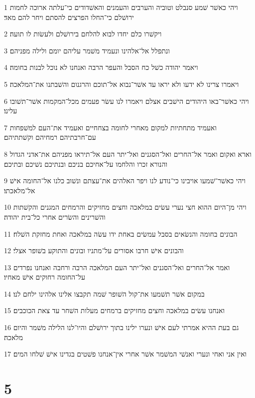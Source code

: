 \par 1 ויהי כאשׁר שׁמע סנבלט וטוביה והערבים והעמנים והאשׁדודים כי־עלתה ארוכה לחמות ירושׁלם כי־החלו הפרצים להסתם ויחר להם מאד׃
\par 2 ויקשׁרו כלם יחדו לבוא להלחם בירושׁלם ולעשׂות לו תועה׃
\par 3 ונתפלל אל־אלהינו ונעמיד משׁמר עליהם יומם ולילה מפניהם׃
\par 4 ויאמר יהודה כשׁל כח הסבל והעפר הרבה ואנחנו לא נוכל לבנות בחומה׃
\par 5 ויאמרו צרינו לא ידעו ולא יראו עד אשׁר־נבוא אל־תוכם והרגנום והשׁבתנו את־המלאכה׃
\par 6 ויהי כאשׁר־באו היהודים הישׁבים אצלם ויאמרו לנו עשׂר פעמים מכל־המקמות אשׁר־תשׁובו עלינו׃
\par 7 ואעמיד מתחתיות למקום מאחרי לחומה בצחחיים ואעמיד את־העם למשׁפחות עם־חרבתיהם רמחיהם וקשׁתתיהם׃
\par 8 וארא ואקום ואמר אל־החרים ואל־הסגנים ואל־יתר העם אל־תיראו מפניהם את־אדני הגדול והנורא זכרו והלחמו על־אחיכם בניכם ובנתיכם נשׁיכם ובתיכם׃
\par 9 ויהי כאשׁר־שׁמעו אויבינו כי־נודע לנו ויפר האלהים את־עצתם ונשׁוב כלנו אל־החומה אישׁ אל־מלאכתו׃
\par 10 ויהי מן־היום ההוא חצי נערי עשׂים במלאכה וחצים מחזיקים והרמחים המגנים והקשׁתות והשׁרינים והשׂרים אחרי כל־בית יהודה׃
\par 11 הבונים בחומה והנשׂאים בסבל עמשׂים באחת ידו עשׂה במלאכה ואחת מחזקת השׁלח׃
\par 12 והבונים אישׁ חרבו אסורים על־מתניו ובונים והתוקע בשׁופר אצלי׃
\par 13 ואמר אל־החרים ואל־הסגנים ואל־יתר העם המלאכה הרבה ורחבה ואנחנו נפרדים על־החומה רחוקים אישׁ מאחיו׃
\par 14 במקום אשׁר תשׁמעו את־קול השׁופר שׁמה תקבצו אלינו אלהינו ילחם לנו׃
\par 15 ואנחנו עשׂים במלאכה וחצים מחזיקים ברמחים מעלות השׁחר עד צאת הכוכבים׃
\par 16 גם בעת ההיא אמרתי לעם אישׁ ונערו ילינו בתוך ירושׁלם והיו־לנו הלילה משׁמר והיום מלאכה׃
\par 17 ואין אני ואחי ונערי ואנשׁי המשׁמר אשׁר אחרי אין־אנחנו פשׁטים בגדינו אישׁ שׁלחו המים׃

\chapter{5}

